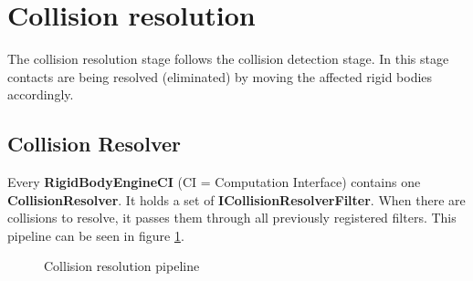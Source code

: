 \documentclass[12p, paper=a4, leqno, colorinlistoftodos]{article}
\begin{document}
	\pagebreak
	\section{Collision resolution}
	The collision resolution stage follows the collision detection stage. In this stage contacts are being resolved (eliminated) by moving the affected rigid bodies accordingly. 
		
		\subsection{Collision Resolver}
		Every \textbf{RigidBodyEngineCI} (CI = Computation Interface) contains one \textbf{CollisionResolver}. It holds a set of \textbf{ICollisionResolverFilter}. When there are collisions to resolve, it passes them through all previously registered filters. This pipeline can be seen in figure \ref{fig:collisionResolutionPipeline}.
		 
		\begin{figure}[H]
			\centering
			\caption{Collision resolution pipeline}
			\label{fig:collisionResolutionPipeline}
		\end{figure}
		 
\end{document}

